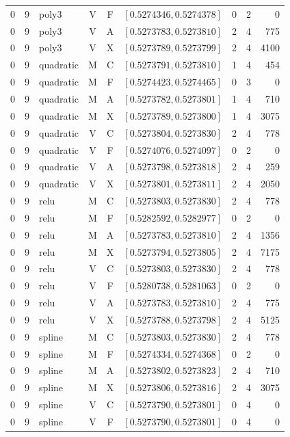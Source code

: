 \begin{longtable}{r r l c c l r r r}
0 & 9 & poly3 & V & F & $[0.5274346,0.5274378]$ & 0 & 2 & 0 \\
0 & 9 & poly3 & V & A & $[0.5273783,0.5273810]$ & 2 & 4 & 775 \\
0 & 9 & poly3 & V & X & $[0.5273789,0.5273799]$ & 2 & 4 & 4100 \\
0 & 9 & quadratic & M & C & $[0.5273791,0.5273810]$ & 1 & 4 & 454 \\
0 & 9 & quadratic & M & F & $[0.5274423,0.5274465]$ & 0 & 3 & 0 \\
0 & 9 & quadratic & M & A & $[0.5273782,0.5273801]$ & 1 & 4 & 710 \\
0 & 9 & quadratic & M & X & $[0.5273789,0.5273800]$ & 1 & 4 & 3075 \\
0 & 9 & quadratic & V & C & $[0.5273804,0.5273830]$ & 2 & 4 & 778 \\
0 & 9 & quadratic & V & F & $[0.5274076,0.5274097]$ & 0 & 2 & 0 \\
0 & 9 & quadratic & V & A & $[0.5273798,0.5273818]$ & 2 & 4 & 259 \\
0 & 9 & quadratic & V & X & $[0.5273801,0.5273811]$ & 2 & 4 & 2050 \\
0 & 9 & relu & M & C & $[0.5273803,0.5273830]$ & 2 & 4 & 778 \\
0 & 9 & relu & M & F & $[0.5282592,0.5282977]$ & 0 & 2 & 0 \\
0 & 9 & relu & M & A & $[0.5273783,0.5273810]$ & 2 & 4 & 1356 \\
0 & 9 & relu & M & X & $[0.5273794,0.5273805]$ & 2 & 4 & 7175 \\
0 & 9 & relu & V & C & $[0.5273803,0.5273830]$ & 2 & 4 & 778 \\
0 & 9 & relu & V & F & $[0.5280738,0.5281063]$ & 0 & 2 & 0 \\
0 & 9 & relu & V & A & $[0.5273783,0.5273810]$ & 2 & 4 & 775 \\
0 & 9 & relu & V & X & $[0.5273788,0.5273798]$ & 2 & 4 & 5125 \\
0 & 9 & spline & M & C & $[0.5273803,0.5273830]$ & 2 & 4 & 778 \\
0 & 9 & spline & M & F & $[0.5274334,0.5274368]$ & 0 & 2 & 0 \\
0 & 9 & spline & M & A & $[0.5273802,0.5273823]$ & 2 & 4 & 710 \\
0 & 9 & spline & M & X & $[0.5273806,0.5273816]$ & 2 & 4 & 3075 \\
0 & 9 & spline & V & C & $[0.5273790,0.5273801]$ & 0 & 4 & 0 \\
0 & 9 & spline & V & F & $[0.5273790,0.5273801]$ & 0 & 4 & 0 \\

\end{longtable}

